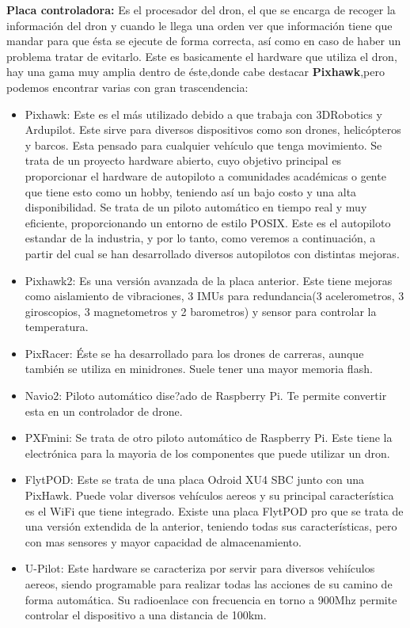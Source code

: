 \hspace{1 cm}\textbf{Placa controladora:} Es el procesador del dron, el que se encarga de recoger la informaci\'on del dron y cuando le llega una orden ver que informaci\'on tiene que mandar para que \'esta se ejecute de forma correcta, as\'i como en caso de haber un problema tratar de evitarlo. Este es basicamente el hardware que utiliza el dron, hay una gama muy amplia dentro de \'este,donde cabe destacar \textbf{Pixhawk},pero podemos encontrar varias con gran trascendencia: 
	\begin{itemize}
		\item Pixhawk: Este es el m\'as utilizado debido a que trabaja con 3DRobotics y Ardupilot. Este sirve para diversos dispositivos como son drones, helic\'opteros y barcos. Esta pensado para cualquier veh\'iculo que tenga movimiento.  Se trata de un proyecto hardware abierto, cuyo objetivo principal es proporcionar el hardware de autopiloto a comunidades acad\'emicas o gente que tiene esto como un hobby, teniendo as\'i un bajo costo y una alta disponibilidad. Se trata de un piloto autom\'atico en tiempo real y muy eficiente, proporcionando un entorno de estilo POSIX. Este es el autopiloto estandar de la industria, y por lo tanto, como veremos a continuaci\'on, a partir del cual se han desarrollado diversos autopilotos con distintas mejoras. 

		\item Pixhawk2: Es una versi\'on avanzada de la placa anterior. Este tiene mejoras como aislamiento de vibraciones, 3 IMUs para redundancia(3 acelerometros, 3 giroscopios, 3 magnetometros y 2 barometros) y sensor para controlar la temperatura. 

		\item PixRacer: \'Este se ha desarrollado para los drones de carreras, aunque tambi\'en se utiliza en minidrones. Suele tener una mayor memoria flash.

		\item Navio2: Piloto autom\'atico dise?ado de Raspberry Pi. Te permite convertir esta en un controlador de drone. 

		\item PXFmini: Se trata de otro piloto autom\'atico de Raspberry Pi. Este tiene la electr\'onica para la mayoria de los componentes que puede utilizar un dron. 

		\item FlytPOD: Este se trata de una placa Odroid XU4 SBC junto con una PixHawk. Puede volar diversos veh\'iculos aereos y su principal caracter\'istica es el WiFi que tiene integrado. Existe una placa FlytPOD pro que se trata de una versi\'on extendida de la anterior, teniendo todas sus caracter\'isticas, pero con mas sensores y mayor capacidad de almacenamiento. 

		\item U-Pilot: Este hardware se caracteriza por servir para diversos vehi\'iculos aereos, siendo programable para realizar todas las acciones de su camino de forma autom\'atica. Su radioenlace con frecuencia en torno a 900Mhz permite controlar el dispositivo a una distancia de 100km. 
	\end{itemize}

